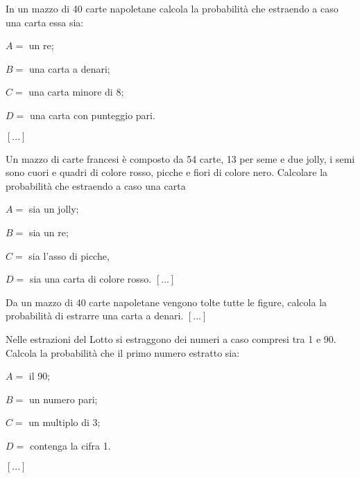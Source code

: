 \begin{esercizio}
 \label{ese:9.20}
 In un mazzo di 40 carte napoletane calcola la probabilità che estraendo a caso 
una carta essa sia:
\begin{itemize*}
\item $ A= $ un re;
\item $ B= $ una carta a denari;
\item $ C= $ una carta minore di 8;
\item $ D = $ una carta con punteggio pari.
\end{itemize*}
\hfill $\left[...\right]$
\end{esercizio}

\begin{esercizio}
 \label{ese:9.21}
Un mazzo di carte francesi è composto da 54 carte, 13 per seme e due jolly, i 
semi sono cuori e quadri di colore rosso, picche e fiori di colore nero. 
Calcolare la probabilità che estraendo a caso una carta
\begin{itemize*}
\item $ A= $ sia un jolly;
\item $ B= $ sia un re;
\item $ C= $ sia l'asso di picche,
\item $ D= $ sia una carta di colore rosso.
\hfill $\left[...\right]$
\end{itemize*}
\end{esercizio}

\begin{esercizio}
 \label{ese:9.22}
Da un mazzo di 40 carte napoletane vengono tolte tutte le figure, calcola la 
probabilità di estrarre una carta a denari.
\hfill $\left[...\right]$
\end{esercizio}


\begin{esercizio}
 \label{ese:9.24}
Nelle estrazioni del Lotto si estraggono dei numeri a caso compresi tra 1 e 90. 
Calcola la probabilità che il primo numero estratto sia:
\begin{itemize*}
\item $ A= $ il 90;
\item $ B= $ un numero pari;
\item $ C= $ un multiplo di 3;
\item $ D= $ contenga la cifra 1.
\end{itemize*}
\hfill $\left[...\right]$
\end{esercizio}

